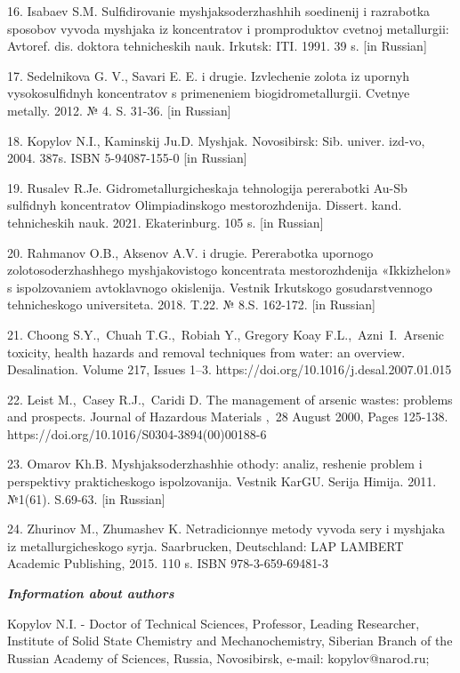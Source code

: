16. Isabaev S.M. Sul\textquotesingle fidirovanie
mysh\textquotesingle jaksoderzhashhih soedinenij i razrabotka sposobov
vyvoda mysh\textquotesingle jaka iz koncentratov i promproduktov cvetnoj
metallurgii: Avtoref. dis. doktora tehnicheskih nauk. Irkutsk: ITI.
1991. 39 s. {[}in Russian{]}

17. Sedel\textquotesingle nikova G. V., Savari E. E. i drugie.
Izvlechenie zolota iz upornyh vysokosul\textquotesingle fidnyh
koncentratov s primeneniem biogidrometallurgii. Cvetnye metally. 2012. №
4. S. 31-36. {[}in Russian{]}

18. Kopylov N.I., Kaminskij Ju.D. Mysh\textquotesingle jak. Novosibirsk:
Sib. univer. izd-vo, 2004. 387s. ISBN 5-94087-155-0 {[}in Russian{]}

19. Rusalev R.Je. Gidrometallurgicheskaja tehnologija pererabotki Au-Sb
sul\textquotesingle fidnyh koncentratov Olimpiadinskogo mestorozhdenija.
Dissert. kand. tehnicheskih nauk. 2021. Ekaterinburg. 105 s. {[}in
Russian{]}

20. Rahmanov O.B., Aksenov A.V. i drugie. Pererabotka upornogo
zolotosoderzhashhego mysh\textquotesingle jakovistogo koncentrata
mestorozhdenija «Ikkizhelon» s ispol\textquotesingle zovaniem
avtoklavnogo okislenija. Vestnik Irkutskogo gosudarstvennogo
tehnicheskogo universiteta. 2018. T.22. № 8.S. 162-172. {[}in Russian{]}

21. Choong S.Y.,~Chuah T.G.,~Robiah Y., Gregory Koay
F.L.,~Azni~I.~Arsenic toxicity, health hazards and removal techniques
from water: an overview. Desalination. Volume 217, Issues 1--3.
https://doi.org/10.1016/j.desal.2007.01.015

22. Leist M.,~Casey R.J.,~Caridi D. The management of arsenic wastes:
problems and prospects. Journal of Hazardous Materials ,~28 August 2000,
Pages 125-138. https://doi.org/10.1016/S0304-3894(00)00188-6

23. Omarov Kh.B. Mysh\textquotesingle jaksoderzhashhie othody: analiz,
reshenie problem i perspektivy prakticheskogo
ispol\textquotesingle zovanija. Vestnik KarGU. Serija Himija. 2011.
№1(61). S.69-63. {[}in Russian{]}

24. Zhurinov M., Zhumashev K. Netradicionnye metody vyvoda sery i
mysh\textquotesingle jaka iz metallurgicheskogo syr\textquotesingle ja.
Saarbrucken, Deutschland: LAP LAMBERT Academic Publishing, 2015. 110 s.
ISBN 978-3-659-69481-3

\emph{{\bfseries Information about authors}}

Kopylov N.I. - Doctor of Technical Sciences, Professor, Leading
Researcher, Institute of Solid State Chemistry and Mechanochemistry,
Siberian Branch of the Russian Academy of Sciences, Russia, Novosibirsk,
e-mail: kopylov@narod.ru;

